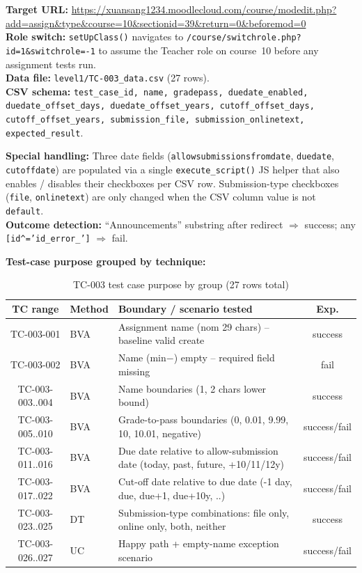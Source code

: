 \documentclass[twoside,final]{hcmut-report}
\begin{document}
\textbf{Target URL:} \url{https://xuansang1234.moodlecloud.com/course/modedit.php?add=assign&type&course=10&sectionid=39&return=0&beforemod=0}\\
\textbf{Role switch:} \texttt{setUpClass()} navigates to \texttt{/course/switchrole.php?id=1\&switchrole=-1} to assume the Teacher role on course~10 before any assignment tests run.\\
\textbf{Data file:} \texttt{level1/TC-003\_data.csv} (27 rows).\\
\textbf{CSV schema:} \texttt{test\_case\_id, name, gradepass, duedate\_enabled, duedate\_offset\_days, duedate\_offset\_years, cutoff\_offset\_days, cutoff\_offset\_years, submission\_file, submission\_onlinetext, expected\_result}.

\textbf{Special handling:} Three date fields (\texttt{allowsubmissionsfromdate}, \texttt{duedate}, \texttt{cutoffdate}) are populated via a single \texttt{execute\_script()} JS helper that also enables / disables their checkboxes per CSV row. Submission-type checkboxes (\texttt{file}, \texttt{onlinetext}) are only changed when the CSV column value is not \texttt{default}.\\
\textbf{Outcome detection:} ``Announcements'' substring after redirect $\Rightarrow$ success; any \texttt{[id\^{}='id\_error\_']} $\Rightarrow$ fail.

\textbf{Test-case purpose grouped by technique:}
\begin{table}[H]
\centering
\renewcommand{\arraystretch}{1.2}
\begin{tabularx}{\textwidth}{|c|l|X|c|}
\hline
\textbf{TC range} & \textbf{Method} & \textbf{Boundary / scenario tested} & \textbf{Exp.} \\ \hline
TC-003-001 & BVA & Assignment name (nom 29 chars) -- baseline valid create & success \\ \hline
TC-003-002 & BVA & Name (min$-$) empty -- required field missing & fail \\ \hline
TC-003-003..004 & BVA & Name boundaries (1, 2 chars lower bound) & success \\ \hline
TC-003-005..010 & BVA & Grade-to-pass boundaries (0, 0.01, 9.99, 10, 10.01, negative) & success/fail \\ \hline
TC-003-011..016 & BVA & Due date relative to allow-submission date (today, past, future, +10/11/12y) & success/fail \\ \hline
TC-003-017..022 & BVA & Cut-off date relative to due date (-1 day, due, due+1, due+10y, ..) & success/fail \\ \hline
TC-003-023..025 & DT & Submission-type combinations: file only, online only, both, neither & success \\ \hline
TC-003-026..027 & UC & Happy path + empty-name exception scenario & success/fail \\ \hline
\end{tabularx}
\caption{TC-003 test case purpose by group (27 rows total)}
\end{table}
\end{document}
